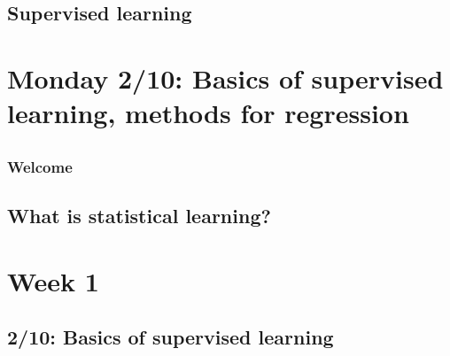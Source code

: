 \documentclass[titlepage,10pt]{scrartcl}
\begin{document}
\subsection{Supervised learning}




\section*{Monday 2/10: Basics of supervised learning, methods for regression}

\subsection{}





\subsubsection{Welcome}


\subsection{What is statistical learning?}

\section*{Week 1}

\subsection*{2/10: Basics of supervised learning}
\end{document}
